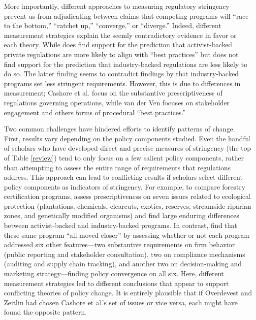 \documentclass[
      12pt,
            Review ]{article}
\begin{document}
More importantly, different approaches to measuring regulatory
stringency prevent us from adjudicating between claims that competing
programs will ``race to the bottom,'' ``ratchet up,'' ``converge,'' or
``diverge.'' Indeed, different measurement strategies explain the seemly
contradictory evidence in favor or each theory. While
\citet{VanderVen2015} does find support for the prediction that
activist-backed private regulations are more likely to align with ``best
practices'' but does not find support for the prediction that
industry-backed regulations are less likely to do so. The latter finding
seems to contradict findings by \citet{Cashore2004} that industry-backed
programs set less stringent requirements. However, this is due to
differences in measurement; Cashore et al. focus on the substantive
prescriptiveness of regulations governing operations, while van der Ven
focuses on stakeholder engagement and others forms of procedural ``best
practices.''

Two common challenges have hindered efforts to identify patterns of
change. First, results vary depending on the policy components studied.
Even the handful of scholars who have developed direct and precise
measures of stringency (the top of Table \ref{review}) tend to only
focus on a few salient policy components, rather than attempting to
assess the entire range of requirements that regulations address. This
approach can lead to conflicting results if scholars select different
policy components as indicators of stringency. For example, to compare
forestry certification programs, \citet{Cashore2004} assess
prescriptiveness on seven issues related to ecological protection
(plantations, chemicals, clearcuts, exotics, reserves, streamside
riparian zones, and genetically modified organisms) and find large
enduring differences between activist-backed and industry-backed
programs. In contrast, \citet{Overdevest2014} find that these same
program ``all moved closer'' by assessing whether or not each program
addressed six other features---two substantive requirements on firm
behavior (public reporting and stakeholder consultation), two on
compliance mechanisms (auditing and supply chain tracking), and another
two on decision-making and marketing strategy---finding policy
convergence on all six. Here, different measurement strategies led to
different conclusions that appear to support conflicting theories of
policy change. It is entirely plausible that if Overdevest and Zeitlin
had chosen Cashore et al.'s set of issues or vice versa, each might have
found the opposite pattern.
\end{document}
